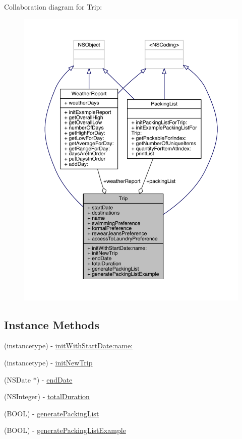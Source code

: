 Collaboration diagram for Trip\-:\nopagebreak
\begin{figure}[H]
\begin{center}
\leavevmode
\includegraphics[width=350pt]{interface_trip__coll__graph}
\end{center}
\end{figure}
\subsection*{Instance Methods}
\begin{DoxyCompactItemize}
\item 
(instancetype) -\/ \hyperlink{interface_trip_aca341893b609059158a3c2809d5fd157}{init\-With\-Start\-Date\-:name\-:}
\item 
(instancetype) -\/ \hyperlink{interface_trip_ab712f4d482a0a2818038069998aea9aa}{init\-New\-Trip}
\item 
(N\-S\-Date $\ast$) -\/ \hyperlink{interface_trip_af45eceb7475c6e48bf48641deb44baf4}{end\-Date}
\item 
(N\-S\-Integer) -\/ \hyperlink{interface_trip_a7d4e8ffcab800bda331f75625eb2c6d3}{total\-Duration}
\item 
(B\-O\-O\-L) -\/ \hyperlink{interface_trip_a90808fe2b7874349bf0a5fc5a09acf3e}{generate\-Packing\-List}
\item 
(B\-O\-O\-L) -\/ \hyperlink{interface_trip_a078c437bbefc9fe136a03093fd549b10}{generate\-Packing\-List\-Example}
\end{DoxyCompactItemize}
